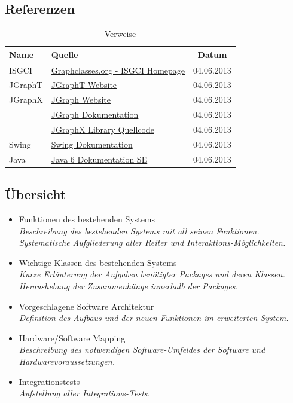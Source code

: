 \documentclass[10pt,a4paper]{article}
\begin{document}
\subsection{Referenzen}
\begin{table}[h]
          	\caption{Verweise}
          	\label{fig:figurename}
          	\begin{center}
          		\begin{tabular}{|l|p{10cm}|c|}
          		\hline
          
          		\hline
          		\textbf{Name} & \textbf{Quelle} & \textbf{Datum} \\
          		\hline
          			 ISGCI & \href{http://www.graphclasses.org/help.html}{Graphclasses.org - ISGCI Homepage} & 04.06.2013\\ \hline
          			 JGraphT & \href{http://jgrapht.org/}{JGraphT Website} & 04.06.2013 \\ \hline
          			 JGraphX & \href{http://www.jgraph.com/}{JGraph Website} & 04.06.2013 \\  \hline
          			  & \href{http://jgraph.github.io/mxgraph/java/docs/index.html}{JGraph Dokumentation} & 04.06.2013 \\  \hline
          			  & \href{https://github.com/jgraph/jgraphx}{JGraphX Library Quellcode} & 04.06.2013\\  \hline
					Swing & \href{http://docs.oracle.com/javase/1.4.2/docs/api/javax/swing/package-summary.html}{Swing Dokumentation} & 04.06.2013 \\  \hline
					Java & \href{http://docs.oracle.com/javase/6/docs/api/}{Java 6 Dokumentation SE} & 04.06.2013 \\  \hline
          		\end{tabular}
          	\end{center}
          \end{table}
\subsection{Übersicht}
\begin{itemize}
\item Funktionen des bestehenden Systems\\
\textit{Beschreibung des bestehenden Systems mit all seinen Funktionen. Systematische Aufgliederung aller Reiter und Interaktions-Möglichkeiten.}
\item Wichtige Klassen des bestehenden Systems\\
\textit{Kurze Erläuterung der Aufgaben benötigter Packages und deren Klassen. Heraushebung der Zusammenhänge innerhalb der Packages.}
\item Vorgeschlagene Software Architektur\\
\textit{Definition des Aufbaus und der neuen Funktionen im erweiterten System.}
\item Hardware/Software Mapping\\
\textit{Beschreibung des notwendigen Software-Umfeldes der Software und Hardwarevoraussetzungen.}
\item Integrationstests\\
\textit{Aufstellung aller Integrations-Tests.}
\end{itemize}  
\newpage
\end{document}
